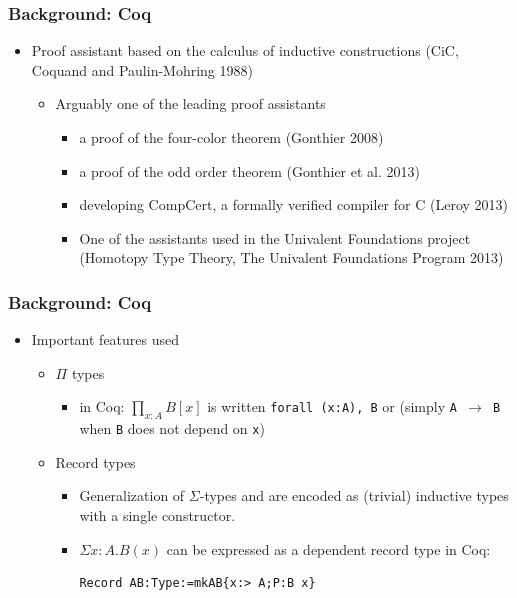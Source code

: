 \documentclass[11pt]{beamer}
\begin{document}
\begin{frame}[fragile]
	\frametitle{Background: Coq}
	
	\begin{itemize}
		
		\item	Proof assistant based on the calculus of inductive
		constructions (CiC, Coquand and Paulin-Mohring 1988)
		
		

	\begin{itemize}
		
		\item Arguably one of the leading proof assistants
	\begin{itemize}
		
		\item  a proof of the four-color
theorem (Gonthier 2008)
\item  a proof of the odd order theorem (Gonthier et al. 2013)
\item  developing CompCert, a formally verified compiler for C (Leroy 2013)
\item One of the assistants used in the Univalent Foundations project (Homotopy Type Theory, The Univalent Foundations Program 2013)
\end{itemize}\end{itemize}
\end{itemize}
\end{frame}


\begin{frame}[fragile]
	\frametitle{Background: Coq}
	
	\begin{itemize}
		
		\item Important features used
		
		\begin{itemize}
			
			\item $\Pi$ types 
			
			\begin{itemize}
				
				\item	in Coq: $\prod_{x:A}B[x]$ is written \texttt{forall (x:A), B} or (simply
			\texttt{A $\to$ B} when \texttt{B} does not depend on \texttt{x}) \end{itemize}
		\item 	Record types
			\begin{itemize}
				
				\item  Generalization of $\Sigma$-types and are encoded as (trivial) inductive types with a single
			constructor.
			
	 
		\item	$\Sigma x:A. B(x)$ can be expressed as a dependent record type in Coq:
			
\begin{verbatim}
Record AB:Type:=mkAB{x:> A;P:B x}
\end{verbatim}
\end{itemize}\end{itemize}\end{itemize}

\end{frame}
\end{document}

